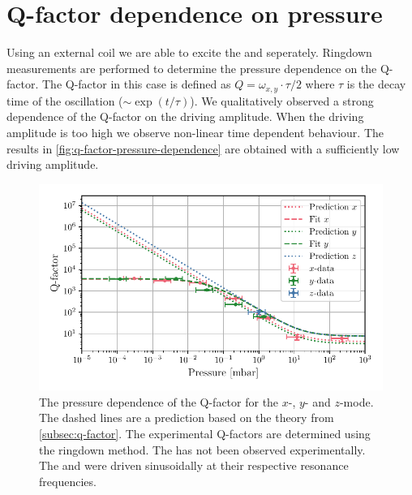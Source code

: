 \section{Q-factor dependence on pressure}
\label{sec:q-factor-dependence-on-pressure}
Using an external coil we are able to excite the \xmode  and \ymode seperately. Ringdown measurements are performed to determine the pressure dependence on the Q-factor. The Q-factor in this case is defined as $Q = \omega_{x,y} \cdot \tau / 2$ where $\tau$ is the decay time of the oscillation ($\sim \exp\left(t / \tau\right)$). We qualitatively observed a strong dependence of the Q-factor on the driving amplitude. When the driving amplitude is too high we observe non-linear time dependent behaviour. The results in \autoref{fig:q-factor-pressure-dependence} are obtained with a sufficiently low driving amplitude.

\begin{figure}
    \centering
    \includegraphics{figures/data/q_factor_pressure_dependence.pdf}
    \caption{The pressure dependence of the Q-factor for the $x$-, $y$- and $z$-mode. The dashed lines are a prediction based on the theory from \autoref{subsec:q-factor}. The experimental Q-factors are determined using the ringdown method. The \zmode has not been observed experimentally. The \xmode and \ymode were driven sinusoidally at their respective resonance frequencies.}
    \label{fig:q-factor-pressure-dependence}
\end{figure}

